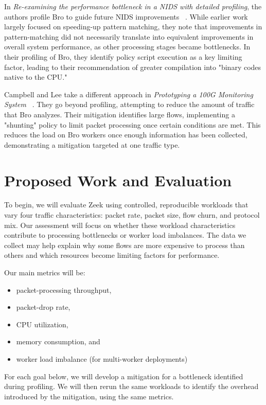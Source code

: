 \documentclass[sigconf, 10pt, nonacm]{acmart}
\begin{document}
In \textit{Re-examining the performance bottleneck in a NIDS with detailed profiling},
the authors profile Bro to guide future NIDS improvements ~\cite{lin2013}. While earlier work largely focused on speeding-up 
pattern matching, they note that improvements in pattern-matching
did not necessarily translate into equivalent improvements in overall 
system performance, as other processing stages became bottlenecks. 
In their profiling of Bro, they identify policy script execution as a key limiting 
factor, leading to their recommendation of greater compilation into
"binary codes native to the CPU."

Campbell and Lee take a different approach in \textit{Prototyping a 100G Monitoring System}
~\cite{campbell2012}. They go beyond profiling, attempting to reduce the amount
of traffic that Bro analyzes. Their mitigation identifies large flows,
implementing a "shunting" policy to limit packet processing once certain conditions
are met. This reduces the load on Bro workers once enough information has been
collected, demonstrating a mitigation targeted at one traffic type.

\section{Proposed Work and Evaluation}

To begin, we will evaluate Zeek using controlled, reproducible workloads that 
vary four traffic characteristics: packet rate, packet size, flow churn, and 
protocol mix. Our assessment will focus on whether these workload
 characteristics contribute to processing bottlenecks or worker 
 load imbalances. The data we collect may help explain why some flows are 
 more expensive to process than others and which resources become
  limiting factors for performance.

Our main metrics will be:

\begin{itemize}
    \item packet-processing throughput,
    \item packet-drop rate,
    \item CPU utilization,
    \item memory consumption, and
    \item worker load imbalance (for multi-worker deployments)
\end{itemize}

For each goal below, we will develop a mitigation for a bottleneck identified 
during profiling. We will then rerun the same workloads to identify the overhead
introduced by the mitigation, using the same metrics.
\end{document}
